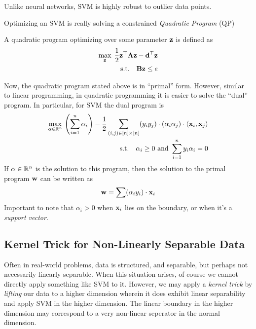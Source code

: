         \begin{prop}
            Unlike neural networks, SVM is highly robust to outlier data points.
        \end{prop}
        Optimizing an SVM is really solving a constrained {\em Quadratic Program} (QP)
        \begin{defn}
            A quadratic program optimizing over some parameter $\mathbf{z}$ is defined as
            \begin{align*}
                \max_{\mathbf{z}}{} \; \frac{1}{2} \mathbf{z}^\top \mathbf{A} \mathbf{z} - {\bf d}^\top \mathbf{z} \\
                \text{s.t.} \quad {\bf B}\mathbf{z} \leq e
            \end{align*}
        \end{defn}
        Now, the quadratic program stated above is in ``primal'' form. However, similar to linear programming, in quadratic
        programming it is easier to solve the ``dual'' program. In particular, for SVM the dual program is
        \begin{align*}
            \max_{\alpha \in \mathbb{R}^n}{} \left( \sum_{i= 1}^n \alpha_i \right) - \frac{1}{2} \sum_{(i,j) \in [n] \times [n]} (y_i y_j) \cdot (\alpha_i \alpha_j) \cdot \langle \mathbf{x}_i, \mathbf{x}_j \rangle  \label{eqn:svm:dual} \\
            \text{s.t.} \quad \alpha_i \geq 0 \ \text{and} \ \sum_{i = 1}^n y_i \alpha_i = 0
        \end{align*}
        If $\alpha \in \mathbb{R}^n$ is the solution to this program, then the solution to the primal program $\mathbf{w}$ can be written as
        \begin{align*}
            \mathbf{w} = \sum (\alpha_i y_i) \cdot \mathbf{x}_i
        \end{align*}
        Important to note that $\alpha_i > 0$ when $\mathbf{x}_i$ lies on the boundary, or when it's a {\em support vector}. 

\subsection{Kernel Trick for Non-Linearly Separable Data}
Often in real-world problems, data is structured, and separable, but perhaps not necessarily
linearly separable. When this situation arises, of course we cannot directly apply something like SVM
to it. However, we may apply a {\em kernel trick} by {\em lifting} our data to a higher dimension wherein
it does exhibit linear separability and apply SVM in the higher dimension. The linear boundary in the higher
dimension may correspond to a very non-linear seperator in the normal dimension.

